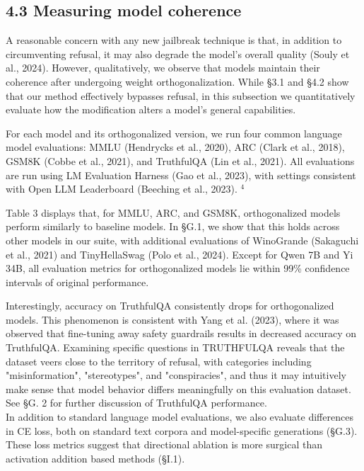 \documentclass[10pt]{article}
\begin{document}
\subsection*{4.3 Measuring model coherence}
A reasonable concern with any new jailbreak technique is that, in addition to circumventing refusal, it may also degrade the model's overall quality (Souly et al., 2024). However, qualitatively, we observe that models maintain their coherence after undergoing weight orthogonalization. While §3.1 and §4.2 show that our method effectively bypasses refusal, in this subsection we quantitatively evaluate how the modification alters a model's general capabilities.

For each model and its orthogonalized version, we run four common language model evaluations: MMLU (Hendrycks et al., 2020), ARC (Clark et al., 2018), GSM8K (Cobbe et al., 2021), and TruthfulQA (Lin et al., 2021). All evaluations are run using LM Evaluation Harness (Gao et al., 2023), with settings consistent with Open LLM Leaderboard (Beeching et al., 2023). ${ }^{4}$

Table 3 displays that, for MMLU, ARC, and GSM8K, orthogonalized models perform similarly to baseline models. In §G.1, we show that this holds across other models in our suite, with additional evaluations of WinoGrande (Sakaguchi et al., 2021) and TinyHellaSwag (Polo et al., 2024). Except for Qwen 7B and Yi 34B, all evaluation metrics for orthogonalized models lie within 99\% confidence intervals of original performance.

Interestingly, accuracy on TruthfulQA consistently drops for orthogonalized models. This phenomenon is consistent with Yang et al. (2023), where it was observed that fine-tuning away safety guardrails results in decreased accuracy on TruthfulQA. Examining specific questions in TRUTHFULQA reveals that the dataset veers close to the territory of refusal, with categories including "misinformation", "stereotypes", and "conspiracies", and thus it may intuitively make sense that model behavior differs meaningfully on this evaluation dataset. See §G. 2 for further discussion of TruthfulQA performance.\\
In addition to standard language model evaluations, we also evaluate differences in CE loss, both on standard text corpora and model-specific generations (§G.3). These loss metrics suggest that directional ablation is more surgical than activation addition based methods (§I.1).
\end{document}
